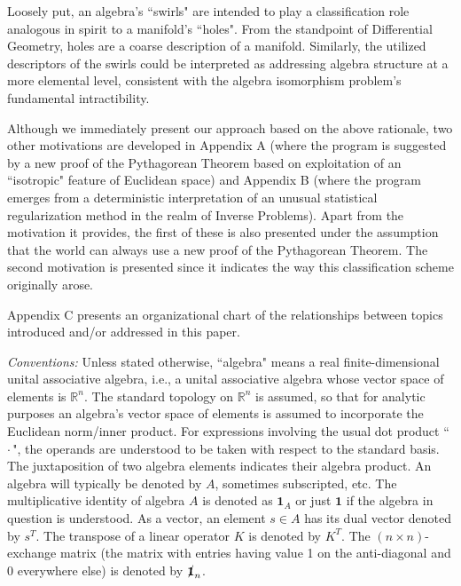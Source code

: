 \documentclass{amsart}
\numberwithin{equation}{section}
\theoremstyle{definition}
\numberwithin{theorem}{section}
\begin{document}
  Loosely put, an algebra's ``swirls" are intended to play a classification role analogous in spirit to a manifold's ``holes".  From the standpoint of Differential Geometry, holes are a coarse description of a manifold.  Similarly, the utilized descriptors of the swirls could be interpreted as addressing algebra structure at a more elemental level, consistent with the algebra isomorphism problem's fundamental intractibility.
  
 Although we immediately present our approach based on the above rationale, two other motivations are developed in Appendix A (where the program is suggested by a new proof of the Pythagorean Theorem based on exploitation of an ``isotropic" feature of Euclidean space) and Appendix B (where the program emerges from a deterministic interpretation of an unusual statistical regularization method in the realm of Inverse Problems).  Apart from the motivation it provides, the first of these is also presented under the assumption that the world can always use a new proof of the Pythagorean Theorem.  The second motivation is presented since it indicates the way this classification scheme originally arose.

            Appendix C presents an organizational chart of the relationships between topics introduced and/or addressed in this paper.     

\bigskip
 
 {\it Conventions:}   Unless stated otherwise, ``algebra" means a real finite-dimensional unital associative algebra, i.e., a unital associative algebra whose vector space of elements is $\mathbb{R}^n$. The standard topology on $\mathbb{R}^n$ is assumed, so that for analytic purposes an algebra's vector space of elements is assumed to incorporate the Euclidean norm/inner product.  For expressions involving the usual dot product ``\,$\cdot$\,", the operands are understood to be taken with respect to the standard basis. The juxtaposition of two algebra elements indicates their algebra product.   An algebra will typically be denoted by $A$, sometimes subscripted, etc. The multiplicative identity of algebra $A$ is denoted as $\mathbf{1}_A$ or just $\mathbf{1}$ if the algebra in question is understood.   As a vector, an element $s\in A$ has its dual vector denoted by $s^T$.  The transpose of a linear operator $K$ is denoted by $K^T$.  The $(n\times n)$-exchange matrix (the matrix with entries having value 1 on the anti-diagonal and 0 everywhere else) is denoted by  $\slashed{\bf 1}_n$.             
       
\end{document}
